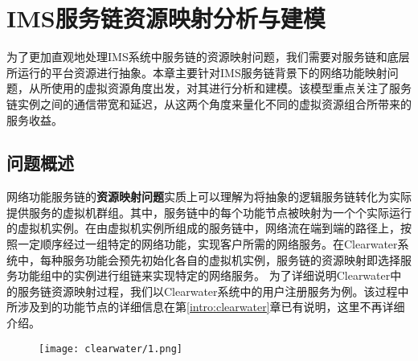 \chapter{IMS服务链资源映射分析与建模}
\label{chap:model}
为了更加直观地处理IMS系统中服务链的资源映射问题，我们需要对服务链和底层所运行的平台资源进行抽象。本章主要针对IMS服务链背景下的网络功能映射问题，从所使用的虚拟资源角度出发，对其进行分析和建模。该模型重点关注了服务链实例之间的通信带宽和延迟，从这两个角度来量化不同的虚拟资源组合所带来的服务收益。

\section{问题概述}
网络功能服务链的\textbf{资源映射问题}实质上可以理解为将抽象的逻辑服务链转化为实际提供服务的虚拟机群组。其中，服务链中的每个功能节点被映射为一个个实际运行的虚拟机实例。在由虚拟机实例所组成的服务链中，网络流在端到端的路径上，按照一定顺序经过一组特定的网络功能，实现客户所需的网络服务。在Clearwater系统中，每种服务功能会预先初始化各自的虚拟机实例，服务链的资源映射即选择服务功能组中的实例进行组链来实现特定的网络服务。
为了详细说明Clearwater中的服务链资源映射过程，我们以Clearwater系统中的用户注册服务为例。该过程中所涉及到的功能节点的详细信息在第\ref{intro:clearwater}章已有说明，这里不再详细介绍。

\begin{figure}[!htp]
	\centering
	\texttt{[image: clearwater/1.png]}
\end{figure}

